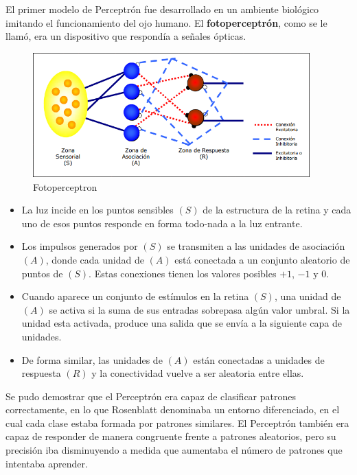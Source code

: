 \documentclass[a4paper, 11pt]{article} %
\begin{document}
El primer modelo de Perceptrón fue desarrollado en un ambiente biológico imitando el funcionamiento del ojo humano. El \textbf{fotoperceptrón}, como se le llamó, era un dispositivo que respondía a señales ópticas.

\begin{figure}[H]
\centering
\includegraphics[width=0.95\textwidth]{Fotoperceptron.PNG}
\caption{Fotoperceptron}
\label{Fotoperceptron}
\end{figure}

\begin{itemize}
    \item La luz incide en los puntos sensibles $(S)$ de la estructura de la retina y cada uno de esos puntos responde en forma todo-nada a la luz entrante.
    \item Los impulsos generados por $(S)$ se transmiten a las unidades de asociación $(A)$, donde cada unidad de $(A)$ está conectada a un conjunto aleatorio de puntos de $(S)$. Estas conexiones tienen los valores posibles $+1$, $-1$ y $0$.
    \item Cuando aparece un conjunto de estímulos en la retina $(S)$, una unidad de $(A)$ se activa si la suma de sus entradas sobrepasa algún valor umbral. Si la unidad esta activada, produce una salida que se envía a la siguiente capa de unidades.
    \item De forma similar, las unidades de $(A)$ están conectadas a unidades de respuesta $(R)$ y la conectividad vuelve a ser aleatoria entre ellas.
\end{itemize}

Se pudo demostrar que el Perceptrón era capaz de clasificar patrones correctamente, en lo que Rosenblatt denominaba un entorno diferenciado, en el cual cada clase estaba formada por patrones similares. El Perceptrón también era capaz de responder de manera congruente frente a patrones aleatorios, pero su precisión iba disminuyendo a medida que aumentaba el número de patrones que intentaba aprender.
\end{document}
